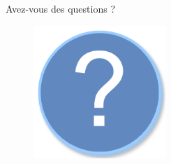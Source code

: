 \documentclass{beamer}
\begin{document}
	\begin{frame}{Avez-vous des questions ?}
		\begin{figure}[H]
			\centering
			\includegraphics[width=5cm]{questions.png}
		\end{figure}
	\end{frame}
\end{document}
